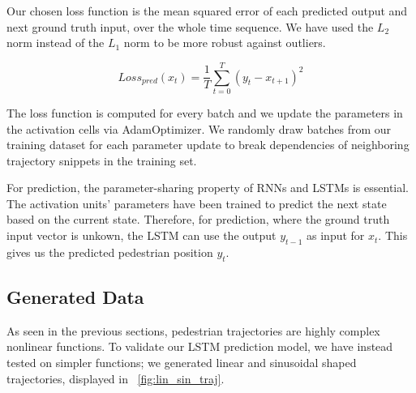 Our chosen loss function is the mean squared error of each predicted output and next ground truth input, over the whole time sequence.
We have used the $L_2$ norm instead of the $L_1$ norm to be more robust against outliers.

\begin{equation}
Loss_{pred}(x_t) = \frac{1}{T} \sum_{t=0}^{T}(y_t - x_{t+1})^2
\label{eq:loss_pred} 
\end{equation}

The loss function is computed for every batch and we update the parameters in the activation cells via AdamOptimizer.
We randomly draw batches from our training dataset for each parameter update to break dependencies of neighboring trajectory snippets in the training set.

For prediction, the parameter-sharing property of RNNs and LSTMs is essential.
The activation units' parameters have been trained to predict the next state based on the current state.
Therefore, for prediction, where the ground truth input vector is unkown, the LSTM can use the output $y_{t-1}$ as input for $x_t$.
This gives us the predicted pedestrian position $y_t$.

\subsection{Generated Data}
As seen in the previous sections, pedestrian trajectories are highly complex nonlinear functions.
To validate our LSTM prediction model, we have instead tested on simpler functions; we generated linear and sinusoidal shaped trajectories, displayed in ~\cref{fig:lin_sin_traj}.

